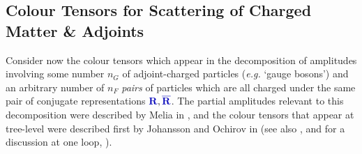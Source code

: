 \documentclass[12pt,a4paper]{article}\let\ifpdf\relax
\begin{document}
\subsection{Colour Tensors for Scattering of Charged Matter \& Adjoints}\label{subsec:tensors_for_charged_matter}\vspace{-4pt}

Consider now the colour tensors which appear in the decomposition of amplitudes involving some number $n_G$ of adjoint-charged particles (\emph{e.g.} `gauge bosons') and an arbitrary number of $n_F$ \emph{pairs} of particles which are all charged under the same pair of conjugate representations $\mathbf{\b{R}},\mathbf{\b{\bar{R}}}$. The partial amplitudes relevant to this decomposition were described by Melia in \cite{Melia:2013bta,Melia:2013epa,Melia:2013xok}, and the colour tensors that appear at tree-level were described first by Johansson and Ochirov in \cite{Johansson:2015oia} (see also \cite{Kosower:1988kh,Johansson:2014zca,Melia:2015ika,Ochirov:2019mtf,Bourjaily:2026adf}, and for a discussion at one loop, \cite{Bern1991ColorDO,Kalin:2017oqr}).
\end{document}
